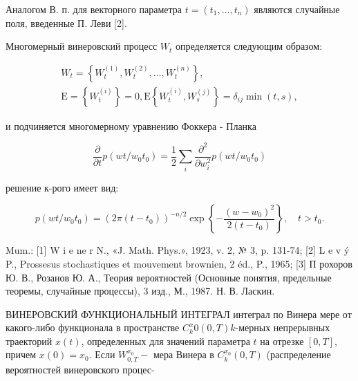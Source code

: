 \documentclass[10pt]{article}
\begin{document}
Аналогом В. п. для векторного параметра $t=\left(t_{1}, \ldots, t_{n}\right)$ являются случайные поля, введенные П. Леви [2].



Многомерный винеровский процесс $W_{t}$ определяется следующим образом:



\[

\begin{gathered}

W_{t}=\left\{W_{t}^{(1)}, W_{t}^{(2)}, \ldots, W_{t}^{(n)}\right\}, \\

\mathrm{E}=\left\{W_{t}^{(i)}\right\}=0, \mathrm{E}\left\{W_{t}^{(i)}, W_{s}^{(j)}\right\}=\delta_{i j} \min (t, s),

\end{gathered}

\]



и подчиняется многомерному уравнению Фоккера - Планка



\[

\frac{\partial}{\partial t} p\left(w t / w_{0} t_{0}\right)=\frac{1}{2} \sum_{i} \frac{\partial^{2}}{\partial w_{i}^{2}} p\left(w t / w_{0} t_{0}\right)

\]



решение к-рого имеет вид:



\[

p\left(w t / w_{0} t_{0}\right)=\left(2 \pi\left(t-t_{0}\right)\right)^{-n / 2} \exp \left\{-\frac{\left(w-w_{0}\right)^{2}}{2\left(t-t_{0}\right)}\right\}, \quad t>t_{0} .

\]



Mum.: [1] W i e ne r N., «J. Math. Phys.», 1923, v. 2, № 3, p. 131-74; [2] L e v ý P., Prossesus stochastiques et mouvement brownien, 2 éd., P., 1965; [3] П рохоров Ю. В., Розанов Ю. А., Теория вероятностей (Основные понятия, предельные теоремы, случайные процессы), 3 изд., М., 1987. Н. В. Ласкин.



ВИНЕРОВСКИЙ ФУНКЦИОНАЛЬНЫЙ ИНТЕГРАЛ интеграл по Винера мере от какого-либо функционала в пространстве $C_{k}^{x} 0(0, T) k$-мерных непрерывных траекторий $x(t)$, определенных для значений параметра $t$ на отрезке $[0, T]$, причем $x(0)=x_{0}$. Если $W_{0, T}^{x_{0}}-$ мера Винера в $C_{k}^{x_{0}}(0, T)$ (распределение вероятностей винеровского процес-
\end{document}
